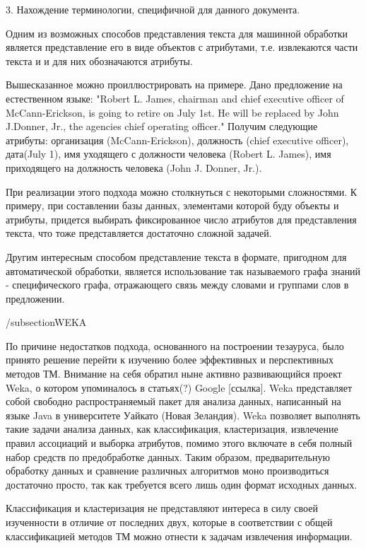 3. Нахождение терминологии, специфичной для данного документа.

Одним из возможных способов представления текста для машинной обработки является
представление его в виде объектов с атрибутами, т.е. извлекаются части текста и 
и для них обозначаются атрибуты.

Вышесказанное можно проиллюстрировать на примере. Дано предложение на 
естественном языке: "Robert L. James, chairman and chief executive
officer of McCann-Erickson, is going to retire on July 1st.  He will
be replaced by John J.Donner, Jr., the agencies chief operating
officer."  Получим следующие атрибуты: организация (McCann-Erickson),
должность (chief executive officer), дата(July 1), имя уходящего с
должности человека (Robert L. James), имя приходящего на должность
человека (John J. Donner, Jr.).

При реализации этого подхода можно столкнуться с некоторыми сложностями. 
К примеру, при составлении базы данных, элементами которой буду объекты и
атрибуты, придется выбирать фиксированное число атрибутов для представления
текста, что тоже представляется достаточно сложной задачей.

Другим интересным способом представление текста в формате, пригодном для
автоматической обработки, является использование так называемого графа знаний - 
специфического графа, отражающего связь между словами и группами слов в предложении.

/subsection{WEKA}

По причине недостатков подхода, основанного на построении тезауруса, было принято решение перейти к 
изучению более эффективных и перспективных методов ТМ. Внимание на себя обратил ныне активно
развивающийся проект Weka, о котором упоминалось в статьях(?) Google [ссылка].
Weka представляет собой свободно распространяемый пакет для анализа данных, 
написанный на языке Java в университете Уайкато (Новая Зеландия). Weka позволяет 
выполнять такие задачи анализа данных, как классификация, кластеризация, извлечение 
правил ассоциаций и выборка атрибутов, помимо этого включате в себя полный набор
средств по предобработке данных. Таким образом, предварительную обработку данных 
и сравнение различных алгоритмов моно производиться достаточно просто, так как 
требуется всего лишь один формат исходных данных.



Классификация и кластеризация не представляют интереса в силу своей изученности в отличие от
последних двух, которые в соответствии с общей классификацией методов ТМ можно отнести к задачам
извлечения информации.

